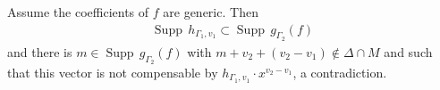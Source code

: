 \documentclass[12pt, english]{article}
\DeclareMathOperator{\Supp}{Supp}
\begin{document}

Assume the coefficients of $f$ are generic. Then
\begin{align*}
	\Supp \, h_{\Gamma_1,v_1} \subset \Supp \, g_{\Gamma_2}(f)
\end{align*}
and there is $m \in \Supp \, g_{\Gamma_2}(f)$ with $m+v_2+(v_2-v_1) \notin \Delta \cap M$ and such that this vector is not compensable by $h_{\Gamma_1,v_1} \cdot x^{v_2-v_1}$, a contradiction.
\end{document}
